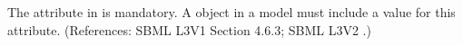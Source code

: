 The attribute  in \Species is mandatory.  A \Species
object in a model must include a value for this attribute.  (References:
SBML L3V1 Section 4.6.3; SBML L3V2 .)
